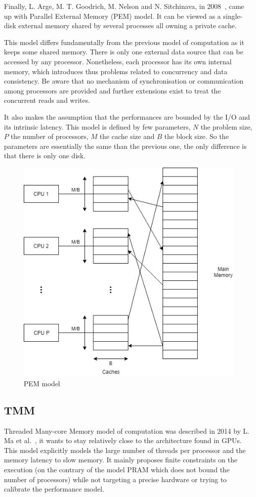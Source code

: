 Finally, L. Arge, M. T. Goodrich, M. Nelson and N. Sitchinava, in 2008~\cite{arge2008fundamental}, came up with Parallel External Memory (PEM) model. It can be viewed as a single-disk external memory shared by several processes all owning a private cache.

This model differs fundamentally from the previous model of computation as it keeps some shared memory. There is only one external data source that can be accessed by any processor. Nonetheless, each processor has its own internal memory, which introduces thus problems related to concurrency and data consistency. Be aware that no mechanism of synchronisation or communication among processors are provided and further extensions exist to treat the concurrent reads and writes.

It also makes the assumption that the performances are bounded by the I/O and its intrinsic latency. This model is defined by few parameters, $N$ the problem size, $P$ the number of processors, $M$ the cache size and $B$ the block size. So the parameters are essentially the same than the previous one, the only difference is that there is only one disk.

\begin{figure}[!htb]
    \centering
    \includegraphics[width=0.5\linewidth]{Chapters/GPU/PEM.png} 
    \caption{PEM model}
\end{figure}

\subsection{TMM}

Threaded Many-core Memory model of computation was described in 2014 by L. Ma et al.~\cite{ma2014memory}, it wants to stay relatively close to the architecture found in GPUs. This model explicitly models the large number of threads per processor and the memory latency to slow memory. It mainly proposes finite constraints on the execution (on the contrary of the model PRAM which does not bound the number of processors) while not targeting a precise hardware or trying to calibrate the performance model.

